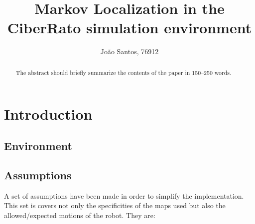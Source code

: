 \documentclass[runningheads]{llncs}
\begin{document}
%
\title{Markov Localization in the CiberRato simulation environment 
}
%
%
\author{João Santos, 76912}
%
%
%
\maketitle              %
%
\begin{abstract}
The abstract should briefly summarize the contents of the paper in
150--250 words. %

\end{abstract}
%
%
%
\section{Introduction}
\label{sec:introduction}


\subsection{Environment}
\label{subsec:environment}




\subsection{Assumptions}
\label{subsec:assumptions}

A set of assumptions have been made in order to simplify the implementation. This set is covers not only the specificities of the maps used but also the allowed/expected motions of the robot. They are:
\end{document}
